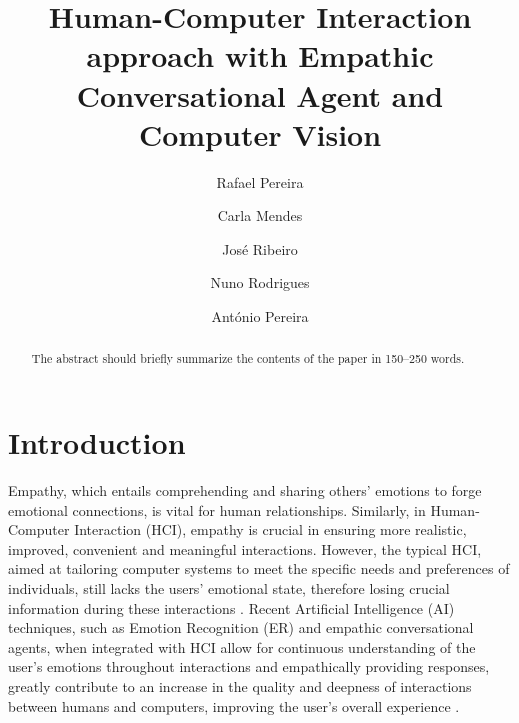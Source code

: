 \documentclass[runningheads]{llncs}
\begin{document}
%
\title{Human-Computer Interaction approach with Empathic Conversational Agent and Computer Vision}
%
%
\author{Rafael Pereira \and
Carla Mendes \and
José Ribeiro \and
Nuno Rodrigues \and
António Pereira}
%
%

%
\maketitle              %
%
\begin{abstract}
The abstract should briefly summarize the contents of the paper in
150--250 words.

\end{abstract}
%
%
%

\section{Introduction}

Empathy, which entails comprehending and sharing others' emotions to forge emotional connections, is vital for human relationships. Similarly, in Human-Computer Interaction (HCI), empathy is crucial in ensuring more realistic, improved, convenient and meaningful interactions. However, the typical HCI, aimed at tailoring computer systems to meet the specific needs and preferences of individuals, still lacks the users' emotional state, therefore losing crucial information during these interactions \cite{jaiswal_facial_2020}.  Recent Artificial Intelligence (AI) techniques, such as Emotion Recognition (ER) and empathic conversational agents, when integrated with HCI allow for continuous understanding of the user's emotions throughout interactions and empathically providing responses, greatly contribute to an increase in the quality and deepness of interactions between humans and computers, improving the user's overall experience \cite{santos_approaches_2018}.
\end{document}

